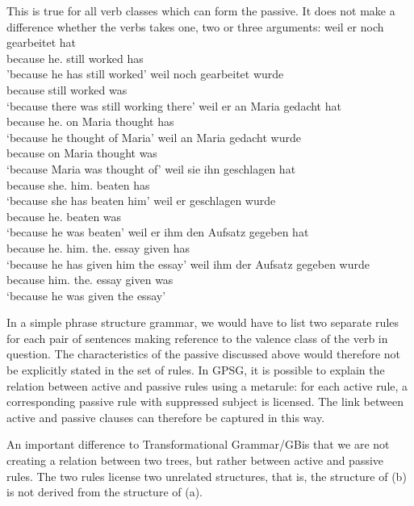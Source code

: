\noindent
This is true for all verb classes which can form the passive. It does not make a difference whether the verbs takes one, two or three arguments:
\eal
\label{beispiel-arbeiten}
\ex 
\gll weil er noch gearbeitet hat\\
	 because he.\nom{} still worked has\\
\glt 'because he has still worked'
\ex 
\gll weil noch gearbeitet wurde\\
	 because still worked was\\
\glt `because there was still working there'
\zl
\eal
\label{beispiel-denken}
\ex 
\gll weil er an Maria gedacht hat\\
	 because he.\nom{} on Maria thought has\\
\glt `because he thought of Maria'
\ex 
\gll weil an Maria gedacht wurde\\
	 because on Maria thought was\\
\glt `because Maria was thought of'
\zl
\eal
\ex 
\gll weil sie ihn geschlagen hat\\
	 because she.\nom{} him.\acc{} beaten has\\
\glt `because she has beaten him'
\ex 
\gll weil er geschlagen wurde\\
	 because he.\nom{} beaten was\\
\glt `because he was beaten'
\zl
\eal
\ex 
\gll weil er ihm den Aufsatz gegeben hat\\
     because he.\nom{} him.\dat{} the.\acc{} essay given has\\
\glt `because he has given him the essay'
\ex 
\gll weil ihm der Aufsatz gegeben wurde\\
     because him.\dat{} the.\nom{} essay given was\\
\glt `because he was given the essay'
\zl

\noindent
In a simple phrase structure grammar, we would have to list  two separate rules for each pair of sentences making reference to the valence class of the
verb in question. The characteristics of the passive discussed above would therefore not be
explicitly stated in the set of rules. In GPSG, it is possible to explain the relation between
active and passive rules using a metarule: for each active rule, a corresponding passive rule with suppressed subject is licensed.
The link between active and passive clauses can therefore be captured in this way.  

An important difference to Transformational Grammar/GB\indexgb\indexmp is that we are not creating a
relation between two trees, but rather between active and passive rules. The two rules license two
unrelated structures, that is, the structure of (b) is not derived from the structure of (a). 

